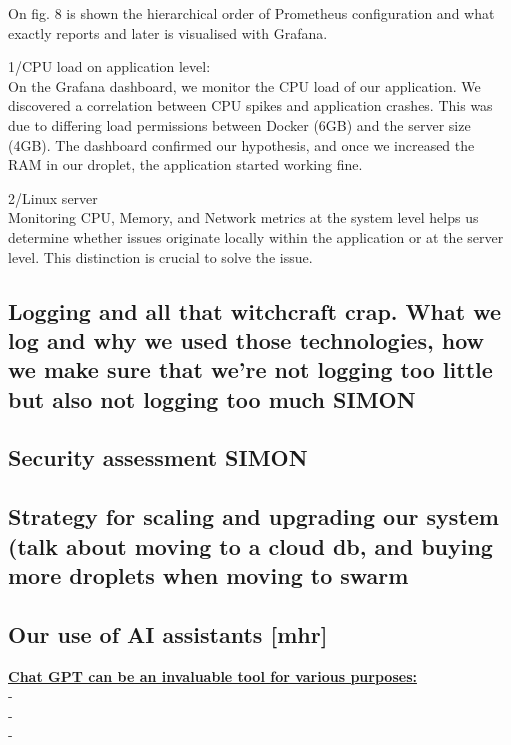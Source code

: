 \documentclass{article}
\begin{document}
On fig. 8 is shown the hierarchical order of Prometheus configuration and what exactly reports and later is visualised with Grafana. 

1/CPU load on application level:
\\On the Grafana dashboard, we monitor the CPU load of our application. We discovered a correlation between CPU spikes and application crashes. This was due to differing load permissions between Docker (6GB) and the server size (4GB). The dashboard confirmed our hypothesis, and once we increased the RAM in our droplet, the application started working fine.

2/Linux server 
\\Monitoring CPU, Memory, and Network metrics at the system level helps us determine whether issues originate locally within the application or at the server level. This distinction is crucial to solve the issue.

\subsection{Logging and all that witchcraft crap. What we log and why we used those technologies, how we make sure that we're not logging too little but also not logging too much SIMON}

\subsection{Security assessment SIMON}

\subsection{Strategy for scaling and upgrading our system (talk about moving to a cloud db, and buying more droplets when moving to swarm}

\subsection{Our use of AI assistants [mhr]}
\noindent \textbf{\underline{Chat GPT can be an invaluable tool for various purposes:}} \\
- \\
- \\
- 
\\
\end{document}
